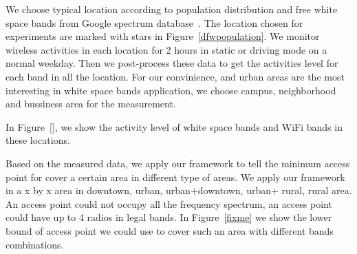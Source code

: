 We choose typical location according to population distribution and free white space bands from Google spectrum 
database~\cite{googledatabase}. The location chosen for experiments are marked with stars in 
Figure~\ref{dfwpopulation}.
We monitor wireless activities in each location for 2 hours in static or driving mode on a normal weekday.
Then we post-process these data to get the activities level for each band in all the location.
For our convinience, and urban areas are the most interesting in white space bands application,
we choose campus, neighborhood and bussiness area for the measurement.
 



In Figure~\ref{}, we show the activity level of white space bands and WiFi bands in these locations.

Based on the measured data, we apply our framework to tell the minimum access point for cover a 
certain area in different type of areas. 
We apply our framework in a x by x area in downtown, urban, urban+downtown, urban+ rural, rural
area. An access point could not occupy all the frequency spectrum, an access point could have up to
 4 radios in legal bands.
 In Figure~\ref{fixme} we show the lower bound of access point we could use to cover such an area 
 with different bands combinations.



